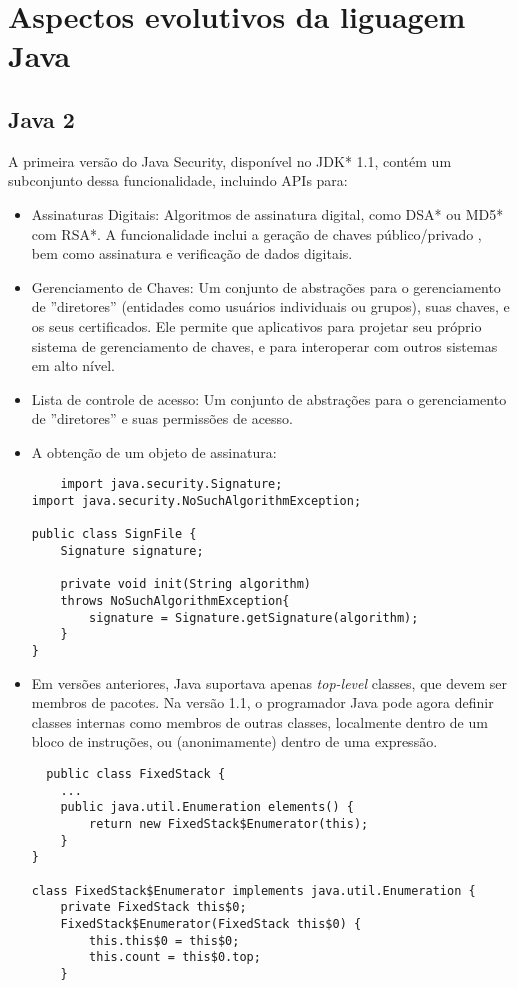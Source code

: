 \section {Aspectos evolutivos da liguagem Java}

\subsection {Java 2}
A primeira versão do Java Security, disponível no JDK* 1.1, contém um subconjunto dessa funcionalidade, incluindo APIs para:
  \begin{itemize}
  \item Assinaturas Digitais: Algoritmos de assinatura digital, como DSA* ou MD5* com RSA*. A funcionalidade inclui a geração de chaves público/privado , bem como assinatura e verificação de dados digitais.
  \item Gerenciamento de Chaves: Um conjunto de abstrações para o gerenciamento de ''diretores'' (entidades como usuários individuais ou grupos), suas chaves, e os seus certificados. Ele permite que aplicativos para projetar seu próprio sistema de gerenciamento de chaves, e para interoperar com outros sistemas em alto nível.
  \item Lista de controle de acesso: Um conjunto de abstrações para o gerenciamento de ''diretores'' e suas permissões de acesso.
  \item A obtenção de um objeto de assinatura: 
  \begin{verbatim}
	import java.security.Signature;
import java.security.NoSuchAlgorithmException;

public class SignFile {
    Signature signature;

    private void init(String algorithm) 
    throws NoSuchAlgorithmException{
        signature = Signature.getSignature(algorithm);
    }
}
  \end{verbatim}
  \item Em versões anteriores, Java suportava apenas {\it top-level} classes, que devem ser membros de pacotes. Na versão 1.1, o programador Java pode agora definir classes internas como membros de outras classes, localmente dentro de um bloco de instruções, ou (anonimamente) dentro de uma expressão.
  \begin{verbatim}
  public class FixedStack {
    ...
    public java.util.Enumeration elements() {
        return new FixedStack$Enumerator(this);
    }
}

class FixedStack$Enumerator implements java.util.Enumeration {
    private FixedStack this$0;
    FixedStack$Enumerator(FixedStack this$0) {
        this.this$0 = this$0;
        this.count = this$0.top;
    }


\end{verbatim}
\end{itemize}
